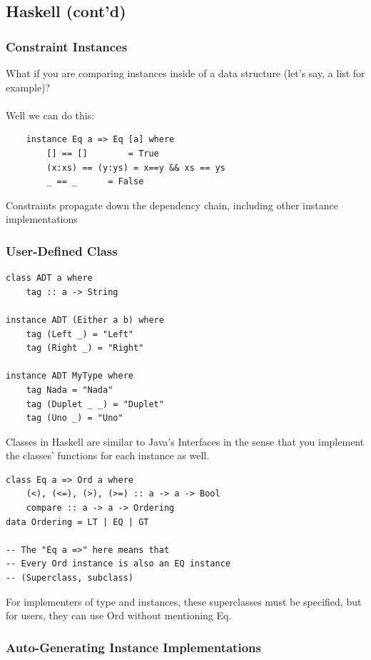 \documentclass[12pt]{article}
\begin{document}
\subsection{Haskell (cont'd)}

\subsubsection{Constraint Instances}

What if you are comparing instances inside of a data structure (let's say, a list for example)?\\
\\
Well we can do this:

\begin{lstlisting}
	instance Eq a => Eq [a] where
		[] == []		= True
		(x:xs) == (y:ys) = x==y && xs == ys
		_ == _		= False
\end{lstlisting}

Constraints propagate down the dependency chain, including other instance implementations

\subsubsection{User-Defined Class}

\begin{lstlisting}
class ADT a where
	tag :: a -> String

instance ADT (Either a b) where
	tag (Left _) = "Left"
	tag (Right _) = "Right"

instance ADT MyType where
	tag Nada = "Nada"
	tag (Duplet _ _) = "Duplet"
	tag (Uno _) = "Uno"
\end{lstlisting}

Classes in Haskell are similar to Java's Interfaces in the sense that you implement the classes' functions for each instance as well.

\begin{lstlisting}
class Eq a => Ord a where
	(<), (<=), (>), (>=) :: a -> a -> Bool
	compare :: a -> a -> Ordering
data Ordering = LT | EQ | GT

-- The "Eq a =>" here means that
-- Every Ord instance is also an EQ instance
-- (Superclass, subclass)
\end{lstlisting}

For implementers of type and instances, these superclasses must be specified, but for users, they can use Ord without mentioning Eq.

\subsubsection{Auto-Generating Instance Implementations}
\end{document}
